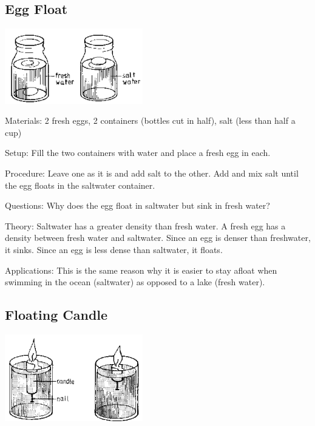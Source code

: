 \begin{multicols}{2}
\subsection{Egg Float}

\begin{center}
\includegraphics[width=0.45\textwidth]{./img/source/egg-float.png}
\end{center}

\begin{description*}
\item[Materials:]{2 fresh eggs, 2 containers (bottles cut in half), salt (less than half a cup)}
\item[Setup:]{Fill the two containers with water and place a fresh egg in each.}
\item[Procedure:]{Leave one as it is and add salt to the other. Add and mix salt until the egg floats in the saltwater container.}
\item[Questions:]{Why does the egg float in saltwater but sink in fresh water?}
\item[Theory:]{Saltwater has a greater density than fresh water. A fresh egg has a density between fresh water and saltwater. Since an egg is denser than freshwater, it sinks. Since an egg is less dense than saltwater, it floats.}
\item[Applications:]{This is the same reason why it is easier to stay afloat when swimming in the ocean (saltwater) as opposed to a lake (fresh water).}
\end{description*}

\subsection{Floating Candle}

\begin{center}
\includegraphics[width=0.45\textwidth]{./img/source/floating-candle.png}
\end{center}


\end{multicols}
